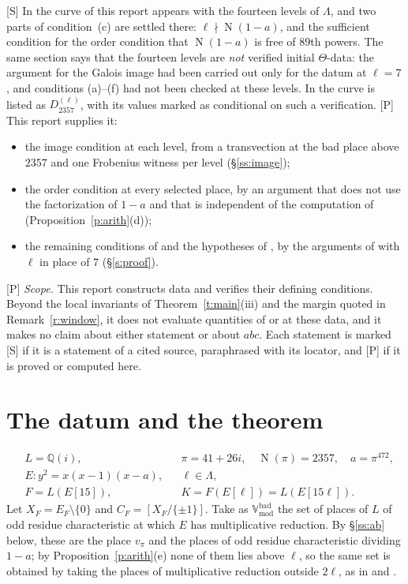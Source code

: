 \documentclass[11pt,a4paper]{article}
\newcommand{\Q}{\mathbb{Q}}
\newcommand{\Vbadmod}{\mathbb{V}^{\mathrm{bad}}_{\mathrm{mod}}}
\newcommand{\Nm}{\operatorname{N}}
\newcommand{\tS}{\textup{[S]}}
\newcommand{\tP}{\textup{[P]}}
\theoremstyle{plain}
\theoremstyle{definition}
\begin{document}
\tS{} In \cite[\S13]{Second} the curve of this report appears with the fourteen levels of $\Lambda$, and two parts of
condition~(c) are settled there: $\ell\nmid\Nm(1-a)$, and the sufficient condition for the order condition that
$\Nm(1-a)$ is free of $89$th powers. The same section says that the fourteen levels are \emph{not} verified initial
$\Theta$-data: the argument for the Galois image had been carried out only for the datum at $\ell=7$, and conditions
(a)--(f) had not been checked at these levels. In \cite{Cat} the curve is listed as $D_{2357}^{(\ell)}$, with its values marked as
conditional on such a verification. \tP{} This report supplies it:

\begin{itemize}
\item the image condition at each level, from a transvection at the bad place above $2357$ and one Frobenius witness
 per level (\S\ref{ss:image});
\item the order condition at every selected place, by an argument that does not use the factorization of $1-a$ and
 that is independent of the computation of \cite[\S13]{Second} (Proposition~\ref{p:arith}(d));
\item the remaining conditions of \cite[Def.~3.1]{IUT1} and the hypotheses of \cite[Thm.~1.10]{IUT4}, by the arguments
 of \cite[\S\S3--4]{Second} with $\ell$ in place of $7$ (\S\ref{s:proof}).
\end{itemize}

\tP{} \emph{Scope.} This report constructs data and verifies their defining conditions. Beyond the local invariants
of Theorem~\ref{t:main}(iii) and the margin quoted in Remark~\ref{r:window}, it does not evaluate quantities of
\cite[Cor.~3.12]{IUT3} or \cite[Thm.~1.10]{IUT4} at these data, and it makes no claim about either statement or about
$abc$. Each statement is marked \tS{} if it is a statement of a cited source, paraphrased with its
locator, and \tP{} if it is proved or computed here.

\section{The datum and the theorem}\label{s:datum}

\begin{equation}\label{e:datum}
\begin{aligned}
 &L=\Q(i), &&\pi=41+26i,\quad \Nm(\pi)=2357,\quad a=\pi^{472},\\
 &E\colon y^2=x(x-1)(x-a), &&\ell\in\Lambda,\\
 &F=L(E[15]), &&K=F(E[\ell])=L(E[15\ell]).
\end{aligned}
\end{equation}
Let $X_F=E_F\setminus\{0\}$ and $C_F=[X_F/\{\pm1\}]$. Take as $\Vbadmod$ the set of places of $L$ of odd residue
characteristic at which $E$ has multiplicative reduction. By \S\ref{ss:ab} below, these are the place $v_\pi$ and
the places of odd residue characteristic dividing $1-a$; by Proposition~\ref{p:arith}(e) none of them lies above
$\ell$, so the same set is obtained by taking the places of multiplicative reduction outside $2\ell$, as in \cite[\S2]{Note} and \cite[\S3]{Cat}.
\end{document}
